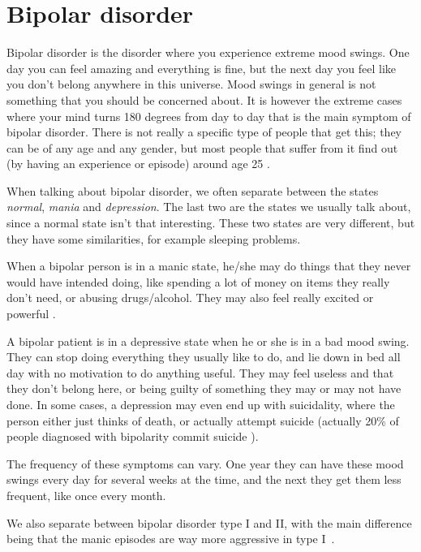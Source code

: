 \newpage
\section{Bipolar disorder}

Bipolar disorder is the disorder where you experience extreme mood swings. One day you can feel amazing and everything is fine, but the next day
you feel like you don't belong anywhere in this universe. Mood swings in general is not something that you should be concerned about. It is however the extreme cases where 
your mind turns 180 degrees from day to day that is the main symptom of bipolar disorder. There is not really a specific type of people that get this; they can be 
of any age and any gender, but most people that suffer from it find out (by having an experience or episode) around age 25 \cite{bipolar_statistics}. 

When talking about bipolar disorder, we often separate between the states \emph{normal}, \emph{mania} and \emph{depression}. The last two are the states we usually talk about, 
since a normal state isn't that interesting. These two states are very different, but they have some similarities, for example sleeping problems. 

When a bipolar person is in a manic state, he/she may do things that they never would have intended doing, like spending a lot of money on items they really don't need, 
or abusing drugs/alcohol. They may also feel really excited or powerful \cite{bipolar_overview}. 

A bipolar patient is in a depressive state when he or she is in a bad mood swing. They can stop doing everything they usually like to do, and lie down in bed all day
with no motivation to do anything useful. They may feel useless and that they don't belong here, or being guilty of something they may or may not have done. In some cases, 
a depression may even end up with suicidality, where the person either just thinks of death, or actually attempt suicide (actually 20\% of people diagnosed with bipolarity 
commit suicide \cite{bipolar_statistics}). 

The frequency of these symptoms can vary. One year they can have these mood swings every day for several weeks at the time, 
and the next they get them less frequent, like once every month. 

We also separate between bipolar disorder type I and II, with the main difference being that the manic episodes are way more aggressive in type I \cite{bipolar_types}.

